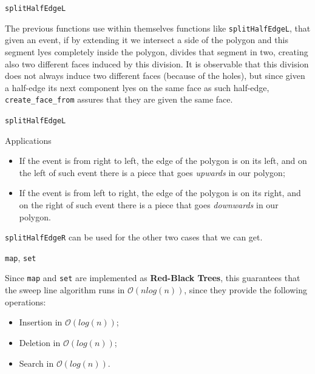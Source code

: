 \documentclass{beamer}
\begin{document}
\begin{frame}{\texttt{splitHalfEdgeL}}

The previous functions use within themselves functions like \texttt{splitHalfEdgeL}, that given an event, if by extending it we intersect a side of the polygon and this segment lyes completely inside the polygon, divides that segment in two, creating also two different faces induced by this division. \pause It is observable that this division does not always induce two different faces (because of the holes), but since given a half-edge its next component lyes on the same face as such half-edge, \texttt{create\_face\_from} assures that they are given the same face.
	
\end{frame}

\begin{frame}{\texttt{splitHalfEdgeL}}

\begin{block}{Applications}
\begin{itemize}[<+->]
	\item If the event is from right to left, the edge of the polygon is on its left, and on the left of such event there is a piece that goes \textit{upwards} in our polygon;
	\item If the event is from left to right, the edge of the polygon is on its right, and on the right of such event there is a piece that goes \textit{downwards} in our polygon.
\end{itemize}
\end{block}

\pause

\bigbreak

\texttt{splitHalfEdgeR} can be used for the other two cases that we can get.
\end{frame}

\begin{frame}{}
	\begin{alertblock}{\texttt{map}, \texttt{set}}
	
	Since \texttt{map} and \texttt{set} are implemented as \textbf{Red-Black Trees}, this guarantees that the sweep line algorithm runs in $\mathcal{O} \left( n log \left( n \right) \right)$, since they provide the following operations:
	
	\pause
	
	\begin{itemize}[<+->]
		\item Insertion in $\mathcal{O} \left( log \left( n \right) \right)$;
		\item Deletion in $\mathcal{O} \left( log \left( n \right) \right)$;
		\item Search in $\mathcal{O} \left( log \left( n \right) \right)$.
	\end{itemize}
		
	\end{alertblock}
\end{frame}
\end{document}
